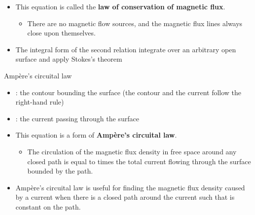 \begin{ELunit}

\begin{itemize}
\tightlist
\item
  This equation is called the \textbf{law of conservation of magnetic flux}.

  \begin{itemize}
  \tightlist
  \item
    There are no magnetic flow sources, and the magnetic flux lines always close upon themselves.
  \end{itemize}
\item
  The integral form of the second relation \ELim{\ELto} integrate over an arbitrary open surface  and apply Stokes's theorem
\end{itemize}


\end{ELunit}

\begin{ELimportant}{Ampère's circuital law}


\end{ELimportant}

\begin{ELunit}

\begin{itemize}
\tightlist
\item
  : the contour bounding the surface  (the contour  and the current  follow the right-hand rule)
\item
  : the current passing through the surface 
\item
  This equation is a form of \textbf{Ampère's circuital law}.

  \begin{itemize}
  \tightlist
  \item
    The circulation of the magnetic flux density in free space around any closed path is equal to  times the total current flowing through the surface bounded by the path.
  \end{itemize}
\item
  Ampère's circuital law is useful for finding the magnetic flux density caused by a current  when there is a closed path  around the current such that  is constant on the path.
\end{itemize}

\end{ELunit}

